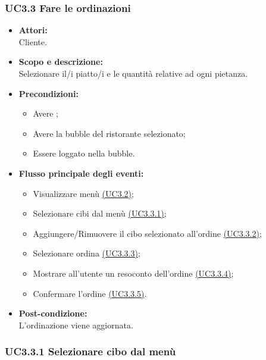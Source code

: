 \subsubsection{UC3.3 Fare le ordinazioni} \label{UC3.3}

\begin{itemize}
	\item \textbf{Attori:}
	\\Cliente.
	\item \textbf{Scopo e descrizione:} 
	\\Selezionare il/i piatto/i e le quantità relative ad ogni pietanza.
	\item \textbf{Precondizioni:}
	\begin{itemize}
		\item Avere ;
		\item Avere la bubble del ristorante selezionato;
		\item Essere loggato nella bubble.
	\end{itemize}
	\item \textbf{Flusso principale degli eventi:}
	\begin{itemize}
		\item Visualizzare menù \hyperref[UC3.2]{(UC3.2)};
		\item Selezionare cibi dal menù \hyperref[UC3.3.1]{(UC3.3.1)};
		\item Aggiungere/Rimuovere il cibo selezionato all’ordine \hyperref[UC3.3.2]{(UC3.3.2)};
		\item Selezionare ordina \hyperref[UC3.3.3]{(UC3.3.3)};
		\item Mostrare all’utente un resoconto dell’ordine \hyperref[UC3.3.4]{(UC3.3.4)};
		\item Confermare l’ordine \hyperref[UC3.3.5]{(UC3.3.5)}.
	\end{itemize}
	\item \textbf{Post-condizione:}
	\\L’ordinazione viene aggiornata.
\end{itemize}

\subsubsection{UC3.3.1 Selezionare cibo dal menù} \label{UC3.3.1}

